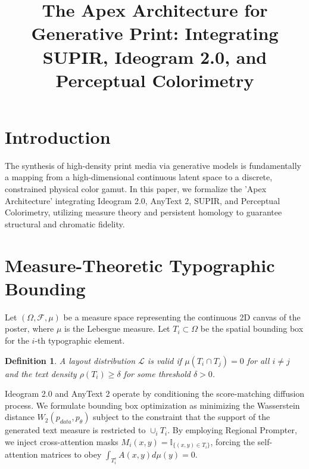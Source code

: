 \documentclass[10pt,journal,compsoc]{IEEEtran}
\begin{document}
\title{The Apex Architecture for Generative Print: Integrating SUPIR, Ideogram 2.0, and Perceptual Colorimetry}


\maketitle
\IEEEdisplaynontitleabstractindextext
\IEEEpeerreviewmaketitle

\newtheorem{theorem}{Theorem}
\newtheorem{lemma}{Lemma}
\newtheorem{definition}{Definition}

\section{Introduction}
The synthesis of high-density print media via generative models is fundamentally a mapping from a high-dimensional continuous latent space to a discrete, constrained physical color gamut. In this paper, we formalize the 'Apex Architecture' integrating Ideogram 2.0, AnyText 2, SUPIR, and Perceptual Colorimetry, utilizing measure theory and persistent homology to guarantee structural and chromatic fidelity.

\section{Measure-Theoretic Typographic Bounding}
Let $(\Omega, \mathcal{F}, \mu)$ be a measure space representing the continuous 2D canvas of the poster, where $\mu$ is the Lebesgue measure. Let $T_i \subset \Omega$ be the spatial bounding box for the $i$-th typographic element. 
\begin{definition}
A layout distribution $\mathcal{L}$ is valid if $\mu(T_i \cap T_j) = 0$ for all $i \neq j$ and the text density $\rho(T_i) \ge \delta$ for some threshold $\delta > 0$.
\end{definition}
Ideogram 2.0 and AnyText 2 operate by conditioning the score-matching diffusion process. We formulate bounding box optimization as minimizing the Wasserstein distance $W_2(p_{data}, p_\theta)$ subject to the constraint that the support of the generated text measure is restricted to $\cup_{i} T_i$. By employing Regional Prompter, we inject cross-attention masks $M_i(x,y) = \mathbb{I}_{\{(x,y) \in T_i\}}$, forcing the self-attention matrices to obey $\int_{T_i^c} A(x,y) d\mu(y) = 0$.
\end{document}

